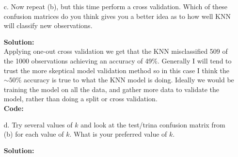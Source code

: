 \documentclass[12pt]{article}
\makeatletter
\theoremstyle{homework}
\newenvironment{exercise}[1]
{\def\@currentlabel{#1}\exercisecore}
{\endexercisecore}
\newcommand{\localhead}[1]{\par\smallskip\noindent\textbf{#1}\nobreak\\}%
\newcommand\solution{\localhead{Solution:}}
\makeatother
\begin{document}
\begin{exercise}{1}
\begin{enumerate}
    \item[c.] Now repeat (b), but this time perform a cross validation. Which of these confusion matrices do you think gives you a better idea as to how well KNN will classify new observations.\\ 
    \solution Applying one-out cross validation we get that the KNN misclassified 509 of the 1000 observations achieving an accuracy of 49\%.
    Generally I will tend to trust the more skeptical model validation method so in this case I think the $\sim 50\%$ accuracy is true to what the KNN model is doing. Ideally we would be training the model on all the data, 
    and gather more data to validate the model, rather than doing a split or cross validation.  \\
    \textbf{Code:}
    \begin{center}
     
    \end{center}
    \vspace{.15in}

    \item[d.] Try several values of $k$ and look at the test/trina confusion matrix from (b) for each value of $k$. What is your preferred value of $k$.\\
    \solution   
  
  
  
      \end{enumerate}

\end{exercise}
\end{document}
